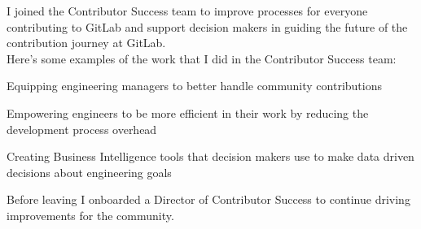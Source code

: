 \documentclass[]{matija-resume}
\begin{document}
\begin{minipage}[t]{1.0\textwidth}
\vspace{\topsep}
I joined the Contributor Success team to improve processes for everyone contributing to GitLab and support decision makers in guiding the future of the contribution journey at GitLab.\\
\vspace{\topsep}
Here's some examples of the work that I did in the Contributor Success team:\\
\vspace{\topsep}
\begin{tightemize}
\item Equipping engineering managers to better handle community contributions
\item Empowering engineers to be more efficient in their work by reducing the development process overhead
\item Creating Business Intelligence tools that decision makers use to make data driven decisions about engineering goals
\end{tightemize}
\vspace{\topsep}
Before leaving I onboarded a Director of Contributor Success to continue driving improvements for the community.
\sectionsep

\end{minipage}
\end{document}
